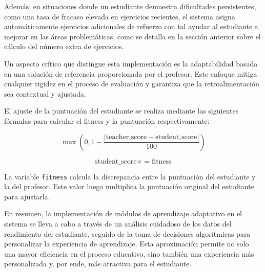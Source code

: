 Además, en situaciones donde un estudiante demuestra dificultades persistentes, como una tasa de fracaso elevada en ejercicios recientes, el sistema asigna automáticamente ejercicios adicionales de refuerzo con tal ayudar al estudiante a mejorar en las áreas problemáticas, como se detalla en la sección anterior sobre el cálculo del número extra de ejercicios.

Un aspecto crítico que distingue esta implementación es la adaptabilidad basada en una solución de referencia proporcionada por el profesor. Este enfoque mitiga cualquier rigidez en el proceso de evaluación y garantiza que la retroalimentación sea contextual y ajustada. 

El ajuste de la puntuación del estudiante se realiza mediante las siguientes fórmulas para calcular el fitness y la puntuación respectivamente:

\begin{equation}
\max\left(0, 1 - \frac{| \text{teacher\_score} - \text{student\_score} |}{100} \right)
\end{equation}

\begin{equation}
\text{student\_score} \times= \text{fitness}
\end{equation}

La variable \texttt{fitness} calcula la discrepancia entre la puntuación del estudiante y la del profesor. Este valor luego multiplica la puntuación original del estudiante para ajustarla. 

En resumen, la implementación de módulos de aprendizaje adaptativo en el sistema se lleva a cabo a través de un análisis cuidadoso de los datos del rendimiento del estudiante, seguido de la toma de decisiones algorítmicas para personalizar la experiencia de aprendizaje. Esta aproximación permite no solo una mayor eficiencia en el proceso educativo, sino también una experiencia más personalizada y, por ende, más atractiva para el estudiante.

